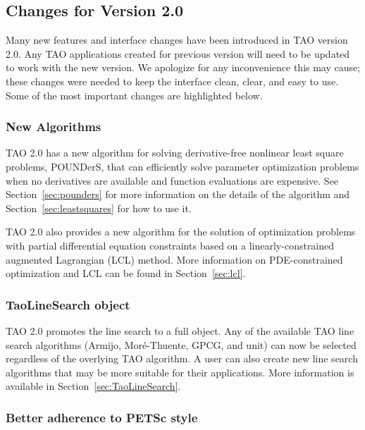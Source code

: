\subsection*{Changes for Version 2.0}

Many new features and interface changes have been introduced in TAO version 2.0.
Any TAO applications created for previous version will need to be updated to 
work with the new version.  We apologize for any inconvenience this may
cause; these changes were needed to keep the interface
clean, 
clear, and easy to use. Some of the most important changes are highlighted 
below.

\subsubsection*{New Algorithms}

TAO 2.0 has a new algorithm for solving derivative-free nonlinear least
square 
problems, POUNDerS, that can efficiently solve parameter optimization problems 
when no derivatives are available and function evaluations are expensive. 
See 
Section~\ref{sec:pounders} for more information on the details of the 
algorithm and Section~\ref{sec:leastsquares} for how to use it.

TAO 2.0 also provides a new algorithm for the solution of optimization
problems with partial differential equation constraints based on a
linearly-constrained augmented Lagrangian (LCL) method.  More 
information on PDE-constrained optimization and LCL can be found 
in Section~\ref{sec:lcl}.

\subsubsection*{TaoLineSearch object}

TAO 2.0 promotes the line search to a full object.  Any of the available 
TAO line search algorithms (Armijo, Mor\'e-Thuente, GPCG, and unit) can now 
be selected regardless of the overlying TAO algorithm.  A user can also
create new line search algorithms that may be more suitable for their
applications.  More information is available in 
Section~\ref{sec:TaoLineSearch}.

\subsubsection*{Better adherence to PETSc style}

